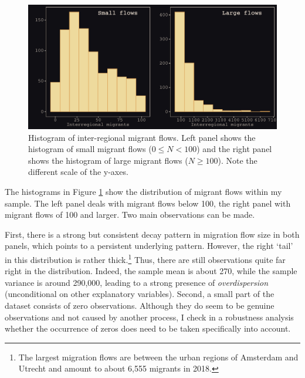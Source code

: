 \documentclass[a4paper,fleqn]{cas-dc}
\begin{document}
{{ \begin{figure}[ht]\centering %
   \includegraphics[width=1.0\linewidth]{./../../fig/hist_mig_corop.pdf}
          \caption{Histogram of inter-regional migrant flows. Left panel shows the histogram of
small migrant flows ($0 \leq N < 100$) and the right panel shows the histogram of
large migrant flows ($N \geq 100$). Note the different scale of the y-axes.}
          \label{fig:hist_mig_corop}
        \end{figure}

The histograms in Figure \ref{fig:hist_mig_corop} show the distribution of
migrant flows within my sample. The left panel deals with migrant flows below
100, the right panel with migrant flows of 100 and larger. Two main observations
can be made.

First, there is a strong but consistent decay pattern in migration flow size in
both panels, which points to a persistent underlying pattern. However, the right
`tail' in this distribution is rather thick.\footnote{The largest migration
  flows are between the urban regions of Amsterdam and Utrecht and amount to about
  6,555 migrants in 2018.} Thus, there are still observations quite far right in
the distribution. Indeed, the sample mean is about 270, while the sample
variance is around 290,000, leading to a strong presence of
\emph{overdispersion} (unconditional on other explanatory variables). Second, a
small part of the dataset consists of zero observations. Although they do seem
to be genuine observations and not caused by another process, I check in a
robustness analysis whether the occurrence of zeros does need to be taken
specifically into account.

}}
\end{document}
